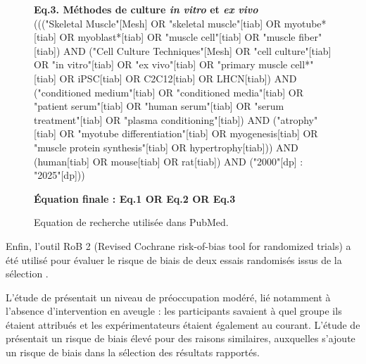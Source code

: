 \documentclass[11pt]{report}
\begin{document}
\begin{figure}[h!]
\begin{tcolorbox}[colback=gray!3,colframe=gray!50, width=0.95\textwidth]
		\vspace{0.5em}
		
		\textbf{Eq.3. Méthodes de culture \textit{in vitro} et \textit{ex vivo}} \\
		((("Skeletal Muscle"[Mesh] OR "skeletal muscle"[tiab] OR myotube*[tiab] OR myoblast*[tiab] OR "muscle cell"[tiab] OR "muscle fiber"[tiab])
		AND
		("Cell Culture Techniques"[Mesh] OR "cell culture"[tiab] OR "in vitro"[tiab] OR "ex vivo"[tiab] OR "primary muscle cell*"[tiab] OR iPSC[tiab] OR C2C12[tiab] OR LHCN[tiab])
		AND
		("conditioned medium"[tiab] OR "conditioned media"[tiab] OR "patient serum"[tiab] OR "human serum"[tiab] OR "serum treatment"[tiab] OR "plasma conditioning"[tiab])
		AND
		("atrophy"[tiab] OR "myotube differentiation"[tiab] OR myogenesis[tiab] OR "muscle protein synthesis"[tiab] OR hypertrophy[tiab]))
		AND
		(human[tiab] OR mouse[tiab] OR rat[tiab])
		AND
		("2000"[dp] : "2025"[dp]))
		
		\vspace{0.5em}
		
		\textbf{Équation finale : Eq.1 OR Eq.2 OR Eq.3}
		
	\end{tcolorbox}
	
	\caption{Equation de recherche utilisée dans PubMed.}
	\label{fig:recherche_pubmed}
\end{figure}

Enfin, l'outil RoB 2 (Revised Cochrane risk-of-bias tool for randomized trials) a été utilisé pour évaluer le risque de biais de deux essais randomisés issus de la sélection \parencite{Sterne2019Aug}.

L'étude de \textcite{belavy_resistive_2008} présentait un niveau de préoccupation modéré, lié notamment à l'absence d'intervention en aveugle : les participants savaient à quel groupe ils étaient attribués et les expérimentateurs étaient également au courant. L'étude de \textcite{liphardt_response_2020} présentait un risque de biais élevé pour des raisons similaires, auxquelles s'ajoute un risque de biais dans la sélection des résultats rapportés.
\end{document}
